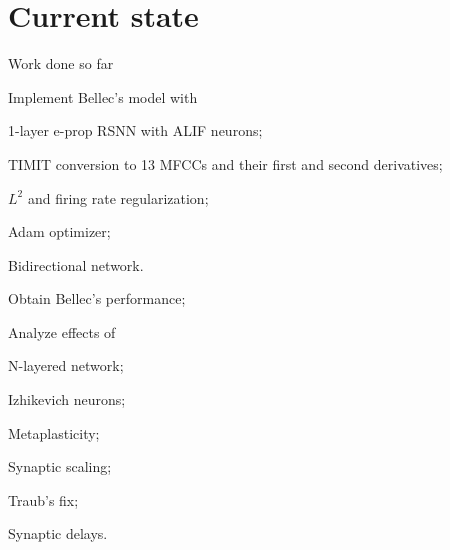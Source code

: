 \documentclass[t]{beamer}
\newcommand{\cmark}{\ding{51}}%
\newcommand{\done}{\rlap{$\square$}{\raisebox{2pt}{\large\hspace{1pt}\cmark}}%
\hspace{-2.5pt}}
\begin{document}
\section{Current state}
\begin{frame}{Work done so far}
	\begin{todolist}

    \item[\done] Implement Bellec's model with
    \begin{todolist}
    	\item[\done] 1-layer e-prop RSNN with ALIF neurons;
    	\item[\done] TIMIT conversion to 13 MFCCs and their first and second derivatives;
    	\item[\done] $L^2$ and firing rate regularization;
    	\item[\done] Adam optimizer;
    \item[\done] Bidirectional network.
    \end{todolist}
    \item Obtain Bellec's performance;
    \item Analyze effects of
    \begin{todolist}
    	\item[\done] N-layered network;
    \item Izhikevich neurons;
    	\item Metaplasticity;
    	\item[\done] Synaptic scaling;
    	\item[\done] Traub's fix;
    	\item Synaptic delays.
    \end{todolist}
  \end{todolist}


\end{frame}
\end{document}
